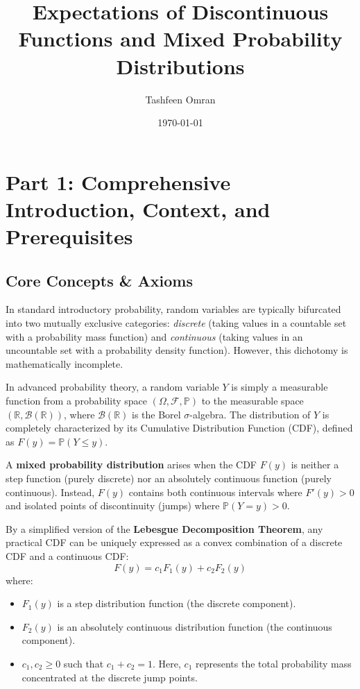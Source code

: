 \documentclass[11pt, a4paper]{article}
\title{\textbf{Expectations of Discontinuous Functions and Mixed Probability Distributions}}
\author{Tashfeen Omran}
\date{\today}
\theoremstyle{definition}
\theoremstyle{remark}
\newcommand{\R}{\mathbb{R}}
\newcommand{\Prob}{\mathbb{P}}
\newcommand{\F}{\mathcal{F}}
\begin{document}
\maketitle
\tableofcontents
\newpage

\section{Part 1: Comprehensive Introduction, Context, and Prerequisites}

\subsection{Core Concepts \& Axioms}
In standard introductory probability, random variables are typically bifurcated into two mutually exclusive categories: \textit{discrete} (taking values in a countable set with a probability mass function) and \textit{continuous} (taking values in an uncountable set with a probability density function). However, this dichotomy is mathematically incomplete. 

In advanced probability theory, a random variable $Y$ is simply a measurable function from a probability space $(\Omega, \F, \Prob)$ to the measurable space $(\R, \mathcal{B}(\R))$, where $\mathcal{B}(\R)$ is the Borel $\sigma$-algebra. The distribution of $Y$ is completely characterized by its Cumulative Distribution Function (CDF), defined as $F(y) = \Prob(Y \le y)$. 

A \textbf{mixed probability distribution} arises when the CDF $F(y)$ is neither a step function (purely discrete) nor an absolutely continuous function (purely continuous). Instead, $F(y)$ contains both continuous intervals where $F'(y) > 0$ and isolated points of discontinuity (jumps) where $\Prob(Y = y) > 0$. 

By a simplified version of the \textbf{Lebesgue Decomposition Theorem}, any practical CDF can be uniquely expressed as a convex combination of a discrete CDF and a continuous CDF:
\[ F(y) = c_1 F_1(y) + c_2 F_2(y) \]
where:
\begin{itemize}
    \item $F_1(y)$ is a step distribution function (the discrete component).
    \item $F_2(y)$ is an absolutely continuous distribution function (the continuous component).
    \item $c_1, c_2 \ge 0$ such that $c_1 + c_2 = 1$. Here, $c_1$ represents the total probability mass concentrated at the discrete jump points.
\end{itemize}
\end{document}
